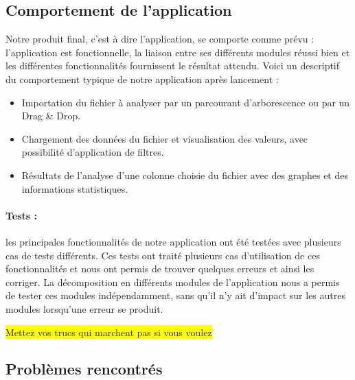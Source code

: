 		\subsection{Comportement de l'application}
		Notre produit final, c'est à dire l'application, se comporte comme prévu : l'application est fonctionnelle, la liaison entre ses différents modules réussi bien et les différentes fonctionnalités fournissent le résultat attendu. Voici un descriptif du comportement typique de notre application après lancement :
		\begin{itemize}
			\item Importation du fichier à analyser par un parcourant d'arborescence ou par un Drag \& Drop.
			\item Chargement des données du fichier et visualisation des valeurs, avec possibilité d'application de filtres. 
			\item Résultats de l'analyse d'une colonne choisie du fichier avec des graphes et des informations statistiques.
		\end{itemize}
		\paragraph{Tests :} les principales fonctionnalités de notre application ont été testées avec plusieurs cas de tests différents. Ces tests ont traité plusieurs cas d'utilisation de ces fonctionnalités et nous ont permis de trouver quelques erreurs et ainsi les corriger. La décomposition en différents modules de l'application nous a permis de tester ces modules indépendamment, sans qu'il n'y ait d'impact sur les autres modules lorsqu'une erreur se produit.
		
		\colorbox{yellow}{Mettez vos trucs qui marchent pas si vous voulez}
		
		\subsection{Problèmes rencontrés}
